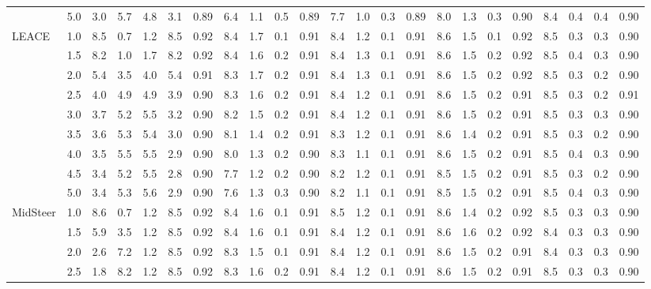 \begin{table}
{\begin{tabular}{lc|cc|ccc|cccc|cccc|cccc|cccc}
 & 5.0 & 3.0 & 5.7 & 4.8 & 3.1 & 0.89 & 6.4 & 1.1 & 0.5 & 0.89 & 7.7 & 1.0 & 0.3 & 0.89 & 8.0 & 1.3 & 0.3 & 0.90 & 8.4 & 0.4 & 0.4 & 0.90 \\
\cline{1-23}
\multirow{9}{*}{LEACE} & 1.0 & 8.5 & 0.7 & 1.2 & 8.5 & 0.92 & 8.4 & 1.7 & 0.1 & 0.91 & 8.4 & 1.2 & 0.1 & 0.91 & 8.6 & 1.5 & 0.1 & 0.92 & 8.5 & 0.3 & 0.3 & 0.90 \\
 & 1.5 & 8.2 & 1.0 & 1.7 & 8.2 & 0.92 & 8.4 & 1.6 & 0.2 & 0.91 & 8.4 & 1.3 & 0.1 & 0.91 & 8.6 & 1.5 & 0.2 & 0.92 & 8.5 & 0.4 & 0.3 & 0.90 \\
 & 2.0 & 5.4 & 3.5 & 4.0 & 5.4 & 0.91 & 8.3 & 1.7 & 0.2 & 0.91 & 8.4 & 1.3 & 0.1 & 0.91 & 8.6 & 1.5 & 0.2 & 0.92 & 8.5 & 0.3 & 0.2 & 0.90 \\
 & 2.5 & 4.0 & 4.9 & 4.9 & 3.9 & 0.90 & 8.3 & 1.6 & 0.2 & 0.91 & 8.4 & 1.2 & 0.1 & 0.91 & 8.6 & 1.5 & 0.2 & 0.91 & 8.5 & 0.3 & 0.2 & 0.91 \\
 & 3.0 & 3.7 & 5.2 & 5.5 & 3.2 & 0.90 & 8.2 & 1.5 & 0.2 & 0.91 & 8.4 & 1.2 & 0.1 & 0.91 & 8.6 & 1.5 & 0.2 & 0.91 & 8.5 & 0.3 & 0.3 & 0.90 \\
 & 3.5 & 3.6 & 5.3 & 5.4 & 3.0 & 0.90 & 8.1 & 1.4 & 0.2 & 0.91 & 8.3 & 1.2 & 0.1 & 0.91 & 8.6 & 1.4 & 0.2 & 0.91 & 8.5 & 0.3 & 0.2 & 0.90 \\
 & 4.0 & 3.5 & 5.5 & 5.5 & 2.9 & 0.90 & 8.0 & 1.3 & 0.2 & 0.90 & 8.3 & 1.1 & 0.1 & 0.91 & 8.6 & 1.5 & 0.2 & 0.91 & 8.5 & 0.4 & 0.3 & 0.90 \\
 & 4.5 & 3.4 & 5.2 & 5.5 & 2.8 & 0.90 & 7.7 & 1.2 & 0.2 & 0.90 & 8.2 & 1.2 & 0.1 & 0.91 & 8.5 & 1.5 & 0.2 & 0.91 & 8.5 & 0.3 & 0.2 & 0.90 \\
 & 5.0 & 3.4 & 5.3 & 5.6 & 2.9 & 0.90 & 7.6 & 1.3 & 0.3 & 0.90 & 8.2 & 1.1 & 0.1 & 0.91 & 8.5 & 1.5 & 0.2 & 0.91 & 8.5 & 0.4 & 0.3 & 0.90 \\
\cline{1-23}
\multirow{9}{*}{MidSteer} & 1.0 & 8.6 & 0.7 & 1.2 & 8.5 & 0.92 & 8.4 & 1.6 & 0.1 & 0.91 & 8.5 & 1.2 & 0.1 & 0.91 & 8.6 & 1.4 & 0.2 & 0.92 & 8.5 & 0.3 & 0.3 & 0.90 \\
 & 1.5 & 5.9 & 3.5 & 1.2 & 8.5 & 0.92 & 8.4 & 1.6 & 0.1 & 0.91 & 8.4 & 1.2 & 0.1 & 0.91 & 8.6 & 1.6 & 0.2 & 0.92 & 8.4 & 0.3 & 0.3 & 0.90 \\
 & 2.0 & 2.6 & 7.2 & 1.2 & 8.5 & 0.92 & 8.3 & 1.5 & 0.1 & 0.91 & 8.4 & 1.2 & 0.1 & 0.91 & 8.6 & 1.5 & 0.2 & 0.91 & 8.4 & 0.3 & 0.3 & 0.90 \\
 & 2.5 & 1.8 & 8.2 & 1.2 & 8.5 & 0.92 & 8.3 & 1.6 & 0.2 & 0.91 & 8.4 & 1.2 & 0.1 & 0.91 & 8.6 & 1.5 & 0.2 & 0.91 & 8.5 & 0.3 & 0.3 & 0.90 \\

\end{tabular}}
\end{table}
